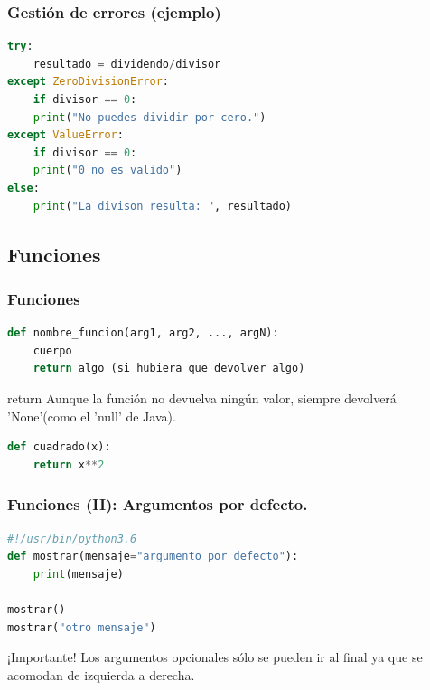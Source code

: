 \documentclass{beamer}
\begin{document}
\begin{frame}[fragile]
\frametitle{Gestión de errores (ejemplo)}
\begin{lstlisting}[language=Python]
try:
	resultado = dividendo/divisor
except ZeroDivisionError:
	if divisor == 0:
	print("No puedes dividir por cero.")
except ValueError:
	if divisor == 0:
	print("0 no es valido")
else:
	print("La divison resulta: ", resultado)
\end{lstlisting}
\end{frame}

\subsection{Funciones}

\begin{frame}[fragile]
\frametitle{Funciones}
\begin{lstlisting}[language=Python]
def nombre_funcion(arg1, arg2, ..., argN):
	cuerpo
	return algo (si hubiera que devolver algo)
\end{lstlisting}
\begin{block}{return}
Aunque la función no devuelva ningún valor, siempre devolverá 'None'(como el 'null' de Java).
\end{block}
\begin{lstlisting}[language=Python]
def cuadrado(x):
	return x**2
\end{lstlisting}
\end{frame}

\begin{frame}[fragile]
\frametitle{Funciones (II): Argumentos por defecto.}
\begin{lstlisting}[language=Python]
#!/usr/bin/python3.6
def mostrar(mensaje="argumento por defecto"):
	print(mensaje)

mostrar()
mostrar("otro mensaje")
\end{lstlisting}\pause
\begin{block}{¡Importante!}
Los argumentos opcionales sólo se pueden ir al final ya que se acomodan de izquierda a derecha.
\end{block}
\end{frame}
\end{document}
